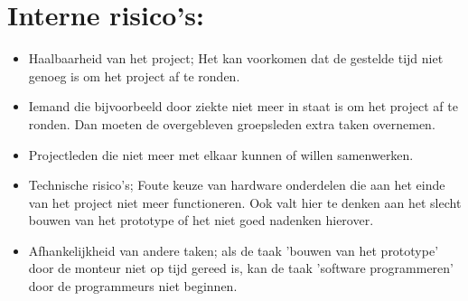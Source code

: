 \documentclass[oneside]{book}
\begin{document}
\section*{Interne risico's:}
\begin{itemize}
\item Haalbaarheid van het project; Het kan voorkomen dat de gestelde tijd niet genoeg is om het project af te ronden.
\item Iemand die bijvoorbeeld door ziekte niet meer in staat is om het project af te ronden. Dan moeten de overgebleven groepsleden extra taken overnemen. 
\item Projectleden die niet meer met elkaar kunnen of willen samenwerken.
\item Technische risico's; Foute keuze van hardware onderdelen die aan het einde van het project niet meer functioneren. Ook valt hier te denken aan het slecht bouwen van het prototype of het niet goed nadenken hierover.
\item Afhankelijkheid  van andere taken; als de taak 'bouwen van het prototype' door de monteur niet op tijd gereed is, kan de taak 'software programmeren' door de programmeurs niet beginnen.
\end{itemize}
 
\end{document}
